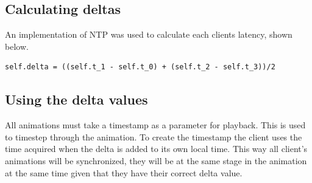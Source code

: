 \subsection{Calculating deltas}
An implementation of NTP was used to calculate each clients latency, shown below.

\begin{verbatim}
self.delta = ((self.t_1 - self.t_0) + (self.t_2 - self.t_3))/2
\end{verbatim}

\subsection {Using the delta values}

All animations must take a timestamp as a parameter for playback. This is used to timestep through the animation. To create the timestamp the client uses the time acquired when the delta is added to its own local time. This way all client's animations will be synchronized, they will be at the same stage in the animation at the same time given that they have their correct delta value. 


